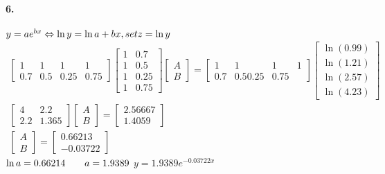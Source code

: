\documentclass[UTF8]{ctexart}
\begin{document}
	\paragraph{6.}
	$y=ae^{bx} \Leftrightarrow \ln y=\ln a+bx, set z = \ln y\\$
	\begin{displaymath}
	\begin{gathered}
		\begin{bmatrix}
			1 & 1 & 1 & 1\\
			0.7 & 0.5 & 0.25 & 0.75
		\end{bmatrix}
		\begin{bmatrix}
			1 & 0.7\\
			1 & 0.5\\
			1 & 0.25\\
			1 & 0.75
		\end{bmatrix}
		\begin{bmatrix}
			A\\B
		\end{bmatrix}
		=
		\begin{bmatrix}
			1 & 1 & 1 & 1\\
			0.7 & 0.5 0.25 & 0.75
		\end{bmatrix}
		\begin{bmatrix}
			\ln(0.99)\\\ln(1.21)\\\ln(2.57)\\\ln(4.23)
		\end{bmatrix}
		\\
		\begin{bmatrix}
			4 & 2.2\\
			2.2 & 1.365
		\end{bmatrix}
		\begin{bmatrix}
			A\\B
		\end{bmatrix}
		=
		\begin{bmatrix}
			2.56667\\1.4059
		\end{bmatrix}
		\\
		\begin{bmatrix}
			A\\B
		\end{bmatrix}
		=
		\begin{bmatrix}
			0.66213\\-0.03722
		\end{bmatrix}
	\end{gathered}
	\end{displaymath}
	$\ln a=0.66214\qquad a=1.9389\\$
	$y=1.9389e^{-0.03722x}$
	
\end{document}
